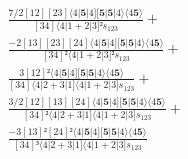 \documentclass[varwidth, border=5pt]{standalone}
\begin{document}
\begin{my}
$\begin{gathered}
\scriptscriptstyle\frac{7/2[12][23]⟨4|𝟓|4][𝟓|𝟓|4⟩⟨4𝟓⟩}{[34]⟨4|1+2|3]²s_{123}} +\\
\scriptscriptstyle\frac{-2[13][23][24]⟨4|𝟓|4][𝟓|𝟓|4⟩⟨4𝟓⟩}{[34]²⟨4|1+2|3]²s_{123}} +\\
\scriptscriptstyle\frac{3[12]²⟨4|𝟓|4][𝟓|𝟓|4⟩⟨4𝟓⟩}{[34]⟨4|2+3|1]⟨4|1+2|3]s_{123}} +\\
\scriptscriptstyle\frac{3/2[12][13][24]⟨4|𝟓|4][𝟓|𝟓|4⟩⟨4𝟓⟩}{[34]²⟨4|2+3|1]⟨4|1+2|3]s_{123}} +\\
\scriptscriptstyle\frac{-3[13]²[24]²⟨4|𝟓|4][𝟓|𝟓|4⟩⟨4𝟓⟩}{[34]³⟨4|2+3|1]⟨4|1+2|3]s_{123}} \phantom{+}
\end{gathered}$
\end{my}
\end{document}
